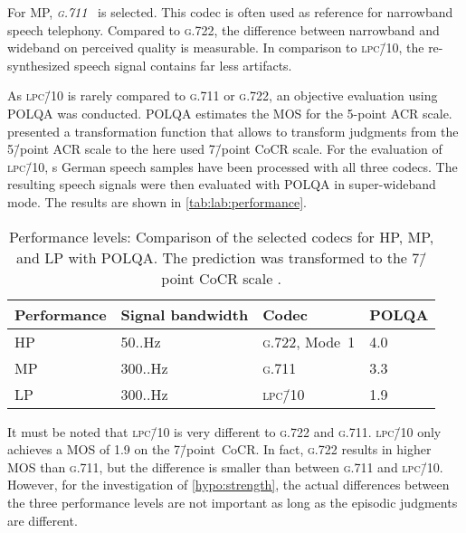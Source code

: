 For \ac{MP}, \emph{\textsc{\lowercase{G.711}}}~\citep{itu-t_recommendation_g.711_pulse_1988} is selected.
This codec is often used as reference for narrowband speech telephony.
Compared to \textsc{\lowercase{G.722}}, the difference between narrowband and wideband on perceived quality is measurable. %
In comparison to \textsc{\lowercase{LPC\=/10}}, the re-synthesized speech signal contains far less artifacts.

As \textsc{\lowercase{LPC\=/10}} is rarely compared to \textsc{\lowercase{G.711}} or \textsc{\lowercase{G.722}}, an objective evaluation using \ac{POLQA} \citep{itu-t_recommendation_p.863_perceptual_2014} was conducted.
\ac{POLQA} estimates the \ac{MOS} for the 5-point \ac{ACR} scale.
\citet{koster_comparison_2015} presented a transformation function that allows to transform judgments from the 5\=/point \ac{ACR} scale to the here used 7\=/point \ac{CoCR} scale. %
For the evaluation of \textsc{\lowercase{LPC\=/10}}, \unit[12]{s} German speech samples have been processed with all three codecs.
The resulting speech signals were then evaluated with \ac{POLQA} in super-wideband mode.
The results are shown in \autoref{tab:lab:performance}.
\begin{table}[t]
 \centering
 \caption[Performance levels: comparison of the selected codecs with \acs{POLQA}]{Performance levels: Comparison of the selected codecs for \acs{HP}, \acs{MP}, and \acs{LP} with \acs{POLQA}.
 The prediction was transformed to the 7\=/point \acs{CoCR} scale \citep{koster_comparison_2015}.}
 \label{tab:lab:performance}
 \begin{tabularx}{\columnwidth}{Y|Y|Y|Y}
   Performance & Signal bandwidth & Codec & \acs{POLQA}\\
   \midrule
   \ac{HP} & 50..\unit[7000]{Hz}  & \textsc{\lowercase{G.722}}, Mode~1 & 4.0 \\ %
   \hline
   \ac{MP} & 300..\unit[3400]{Hz} & \textsc{\lowercase{G.711}}         & 3.3 \\ %
   \hline
   \ac{LP} & 300..\unit[3400]{Hz} & \textsc{\lowercase{LPC\=/10}}        & 1.9 \\ %
   \end{tabularx}
\end{table}
It must be noted that \textsc{\lowercase{LPC\=/10}} is very different to \textsc{\lowercase{G.722}} and \textsc{\lowercase{G.711}}.
\textsc{\lowercase{LPC\=/10}} only achieves a \ac{MOS} of 1.9 on the 7\=/point~\ac{CoCR}.
In fact, \textsc{\lowercase{G.722}} results in higher \ac{MOS} than \textsc{\lowercase{G.711}}, but the difference is smaller than between \textsc{\lowercase{G.711}} and \textsc{\lowercase{LPC\=/10}}.
However, for the investigation of \autoref{hypo:strength}, the actual differences between the three performance levels are not important as long as the episodic judgments are different.

